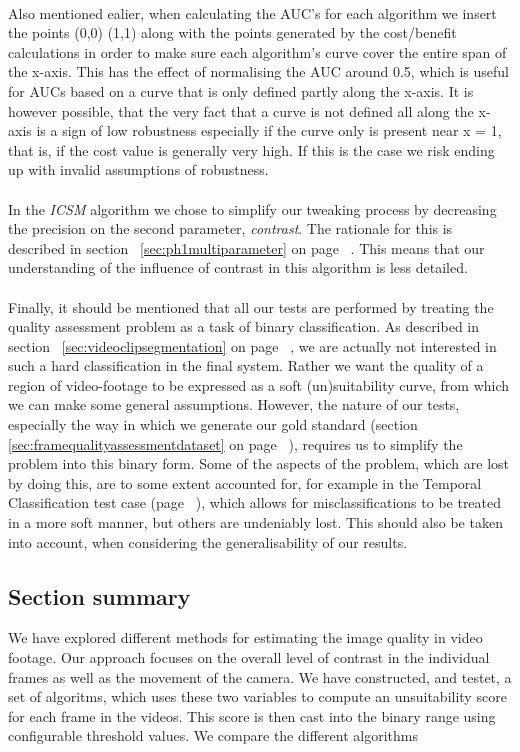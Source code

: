 \\
Also mentioned ealier, when calculating the AUC's for each algorithm we insert the points (0,0) (1,1) along with the points generated by the cost/benefit calculations in order to make sure each algorithm's curve cover the entire span of the x-axis. This has the effect of normalising the AUC around 0.5, which is useful for AUCs based on a curve that is only defined partly along the x-axis. It is however possible, that the very fact that a curve is not defined all along the x-axis is a sign of low robustness especially if the curve only is present near x = 1, that is, if the cost value is generally very high. If this is the case we risk ending up with invalid assumptions of robustness.\\
\\
In the \textit{ICSM} algorithm we chose to simplify our tweaking process by decreasing the precision on the second parameter, \textit{contrast}. The rationale for this is described in section~ \ref{sec:ph1multiparameter} on page ~\pageref{sec:ph1multiparameter}. This means that our understanding of the influence of contrast in this algorithm is less detailed.\\
\\
Finally, it should be mentioned that all our tests are performed by treating the quality assessment problem as a task of binary classification. As described in section~ \ref{sec:videoclipsegmentation} on page ~\pageref{sec:videoclipsegmentation}, we are actually not interested in such a hard classification in the final system. Rather we want the quality of a region of video-footage to be expressed as a soft (un)suitability curve, from which we can make some general assumptions. However, the nature of our tests, especially the way in which we generate our gold standard (section~ \ref{sec:framequalityassessmentdataset} on page ~\pageref{sec:framequalityassessmentdataset}), requires us to simplify the problem into this binary form. Some of the aspects of the problem, which are lost by doing this, are to some extent accounted for, for example in the Temporal Classification test case (page ~\pageref{sec:tctestcase}), which allows for misclassifications to be treated in a more soft manner, but others are undeniably lost. This should also be taken into account, when considering the generalisability of our results.
%
\subsection{Section summary}
%
We have explored different methods for estimating the image quality in video footage. Our approach focuses on the overall level of contrast in the individual frames as well as the movement of the camera. We have constructed, and testet, a set of algoritms, which uses these two variables to compute an unsuitability score for each frame in the videos. This score is then cast into the binary range using configurable threshold values. We compare the different algorithms 